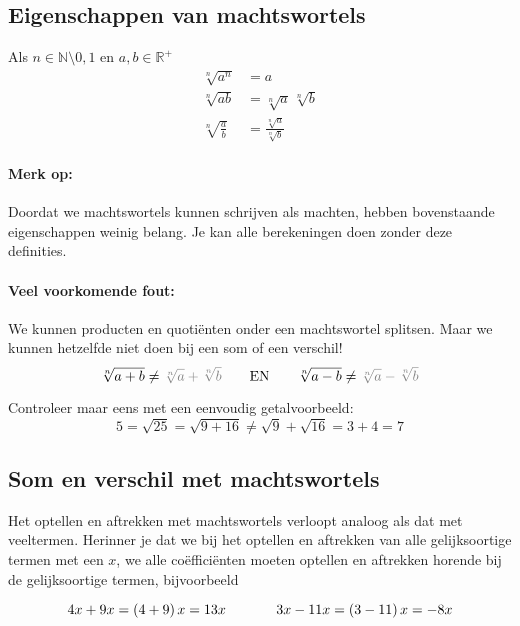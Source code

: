 \documentclass[12pt,twoside]{article}
\begin{document}
\subsection{Eigenschappen van machtswortels}

Als $n\in\mathbb{N}\setminus{0,1}$ en $a,b\in\mathbb{R}^+$
\begin{align*}
  \sqrt[n]{{{a^n}}} &= a\\
  \sqrt[n]{{ab}} &= \sqrt[n]{a}\,\sqrt[n]{b}\\
  \displaystyle \sqrt[n]{{\frac{a}{b}}} &= \frac{{\sqrt[n]{a}}}{{\sqrt[n]{b}}}
\end{align*}

\paragraph*{Merk op: } Doordat we machtswortels kunnen schrijven als machten, hebben bovenstaande eigenschappen weinig belang. Je kan alle berekeningen doen zonder deze definities.

\paragraph*{Veel voorkomende fout:}
We kunnen producten en quotiënten onder een machtswortel splitsen. Maar we kunnen hetzelfde niet doen bij een som of een verschil!
\[\sqrt[n]{{a + b}} \ne {\color{gray}\sqrt[n]{a} + \sqrt[n]{b}}\qquad \text{EN}\qquad\sqrt[n]{{a - b}} \ne {\color{gray}\sqrt[n]{a} - \sqrt[n]{b}}\]

Controleer maar eens met een eenvoudig getalvoorbeeld:
\[5 = \sqrt {25} = \sqrt {9 + 16} \ne \sqrt 9 + \sqrt {16} = 3 + 4 = 7\]



\subsection{Som en verschil met machtswortels}

Het optellen en aftrekken met machtswortels verloopt analoog als dat met veeltermen. Herinner je dat we bij het optellen en aftrekken van alle gelijksoortige termen met een $x$, we alle coëfficiënten moeten optellen en aftrekken horende bij de gelijksoortige termen, bijvoorbeeld

\[4x + 9x = \left( {4 + 9} \right)x = 13x\hspace{0.25in}\hspace{0.25in}3x - 11x = \left( {3 - 11} \right)x = - 8x\]
\end{document}
